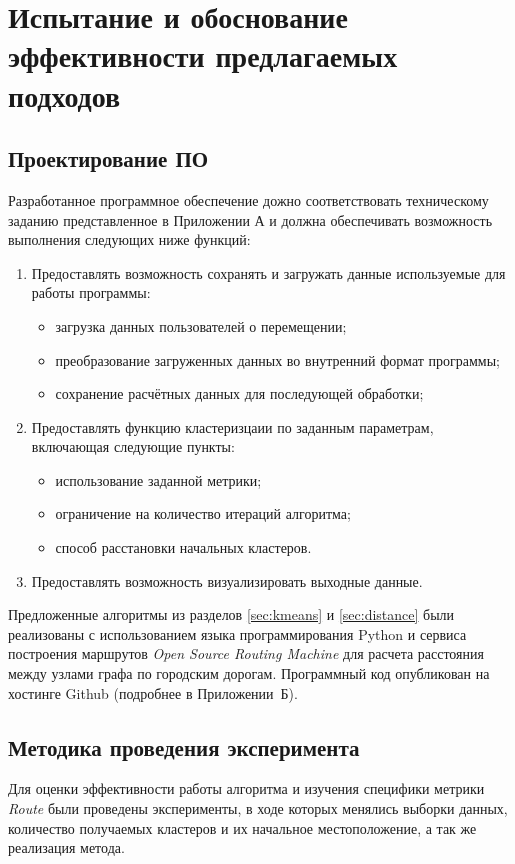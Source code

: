 \chapter{Испытание и обоснование эффективности предлагаемых подходов}
\section{Проектирование ПО}
Разработанное программное обеспечение дожно соответствовать техническому заданию представленное в Приложении А и должна обеспечивать возможность выполнения следующих ниже функций:
\begin{enumerate}
    \item Предоставлять возможность сохранять и загружать данные используемые для работы программы:
    \begin{itemize}
        \item загрузка данных пользователей о перемещении;
        \item преобразование загруженных данных во внутренний формат программы;
        \item сохранение расчётных данных для последующей обработки;
    \end{itemize}
    \item Предоставлять функцию кластеризцаии по заданным параметрам, включающая следующие пункты:
    \begin{itemize}
        \item использование заданной метрики;
        \item ограничение на количество итераций алгоритма;
        \item способ расстановки начальных кластеров.
    \end{itemize}
    \item Предоставлять возможность визуализировать выходные данные.
\end{enumerate}

Предложенные алгоритмы из разделов \ref{sec:kmeans} и \ref{sec:distance} были реализованы с использованием языка программирования Python и сервиса построения маршрутов \emph{Open Source Routing Machine} для расчета расстояния между узлами графа по городским дорогам. Программный код опубликован на хостинге Github (подробнее в Приложении~Б).

\section{Методика проведения эксперимента}
Для оценки эффективности работы алгоритма и изучения специфики метрики \emph{Route} были проведены эксперименты, в ходе которых менялись выборки данных, количество получаемых кластеров и их начальное местоположение, а так же реализация метода.

